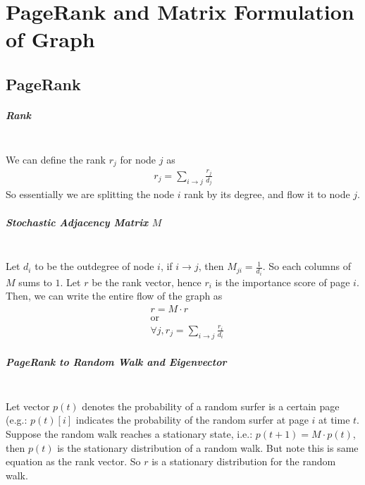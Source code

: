 \chapter{PageRank and Matrix Formulation of Graph} 

\section{PageRank}
\paragraph{Rank}\mbox{}\\
We can define the rank $r_j$ for node $j$ as 
    \begin{align*}
        r_j = \sum_{i\rightarrow j} \frac{r_j}{d_j}
    \end{align*}
So essentially we are splitting the node $i$ rank by its degree, and flow it to node $j$. 



\paragraph{Stochastic Adjacency Matrix $M$}\mbox{}\\
Let $d_i$ to be the outdegree of node $i$, if $i \rightarrow j$, then $M_{ji} = \frac{1}{d_i}$. So each columns of $M$ sums to $1$. Let $r$ be the rank vector, hence $r_i$ is the importance score of page $i$. Then, we can write the entire flow of the graph as 
    \begin{align*}
        & r = M \cdot r \\
        & \textrm{or}\\
        & \forall j, r_j = \sum_{i\rightarrow j} \frac{r_i}{d_i}
    \end{align*}

\paragraph{PageRank to Random Walk and Eigenvector}\mbox{}\\
Let vector $p(t)$ denotes the probability of a random surfer is a certain page (e.g.: $p(t)[i]$ indicates the probability of the random surfer at page $i$ at time $t$. Suppose the random walk reaches a stationary state, i.e.: $p(t+1) = M \cdot p(t)$, then $p(t)$ is the stationary distribution of a random walk. But note this is same equation as the rank vector. So $r$ is a stationary distribution for the random walk. \\

